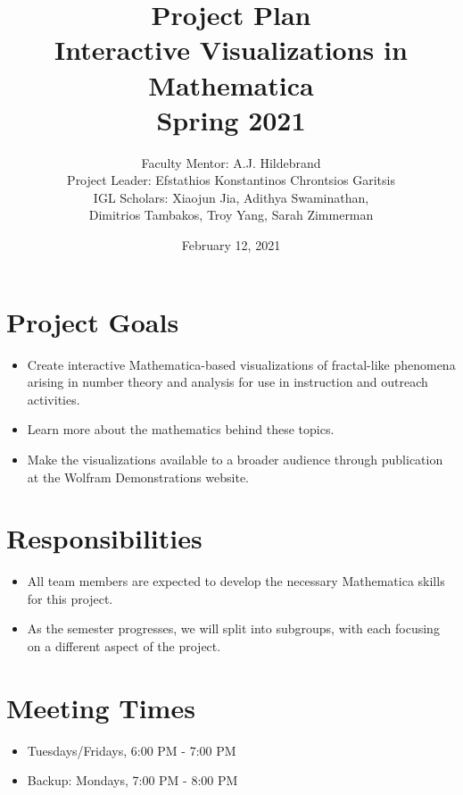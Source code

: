 \documentclass[12pt]{article}
\begin{document}
\title{Project Plan\\ 
Interactive Visualizations in Mathematica 
\\
Spring 2021}
\author{Faculty Mentor: A.J. Hildebrand \\
    Project Leader: Efstathios Konstantinos Chrontsios Garitsis \\
	IGL Scholars: Xiaojun Jia, Adithya Swaminathan, \\
	Dimitrios Tambakos, Troy Yang, Sarah Zimmerman}
	\date{February 12, 2021}
\maketitle
\section{Project Goals}
\begin{itemize}
\item  Create interactive Mathematica-based visualizations of 
fractal-like phenomena arising in number theory and analysis
for use in instruction and outreach activities.
\item Learn more about the mathematics behind these topics.
\item Make the visualizations available to a broader audience through publication at the Wolfram Demonstrations website.
\end{itemize}

\section{Responsibilities}
\begin{itemize}

\item All team members are expected to develop the necessary Mathematica skills for this project.


\item As the semester progresses, we will split into subgroups, with each focusing on a different aspect of the project.

\end{itemize}

\section{Meeting Times}
\begin{itemize}
	\item Tuesdays/Fridays,  6:00 PM - 7:00 PM
	\item Backup: Mondays, 7:00 PM - 8:00 PM
\end{itemize}
\end{document}
